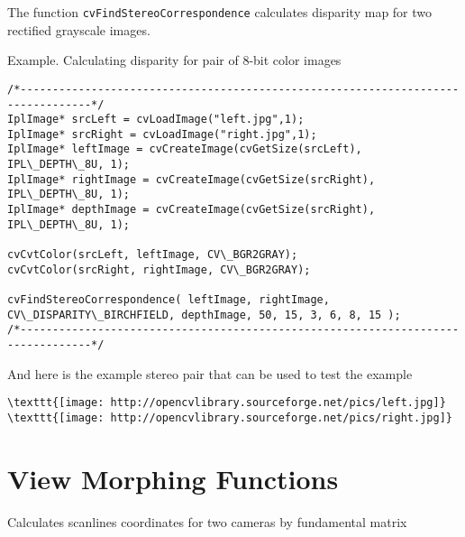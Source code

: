 The function \texttt{cvFindStereoCorrespondence} calculates disparity map for two rectified grayscale images.

Example. Calculating disparity for pair of 8-bit color images

\begin{lstlisting}
/*---------------------------------------------------------------------------------*/
IplImage* srcLeft = cvLoadImage("left.jpg",1);
IplImage* srcRight = cvLoadImage("right.jpg",1);
IplImage* leftImage = cvCreateImage(cvGetSize(srcLeft), IPL\_DEPTH\_8U, 1);
IplImage* rightImage = cvCreateImage(cvGetSize(srcRight), IPL\_DEPTH\_8U, 1);
IplImage* depthImage = cvCreateImage(cvGetSize(srcRight), IPL\_DEPTH\_8U, 1);

cvCvtColor(srcLeft, leftImage, CV\_BGR2GRAY);
cvCvtColor(srcRight, rightImage, CV\_BGR2GRAY);

cvFindStereoCorrespondence( leftImage, rightImage, CV\_DISPARITY\_BIRCHFIELD, depthImage, 50, 15, 3, 6, 8, 15 );
/*---------------------------------------------------------------------------------*/

\end{lstlisting}

And here is the example stereo pair that can be used to test the example

\begin{lstlisting}
\texttt{[image: http://opencvlibrary.sourceforge.net/pics/left.jpg]} 
\texttt{[image: http://opencvlibrary.sourceforge.net/pics/right.jpg]}
\end{lstlisting}

\section{View Morphing Functions}


Calculates scanlines coordinates for two cameras by fundamental matrix


